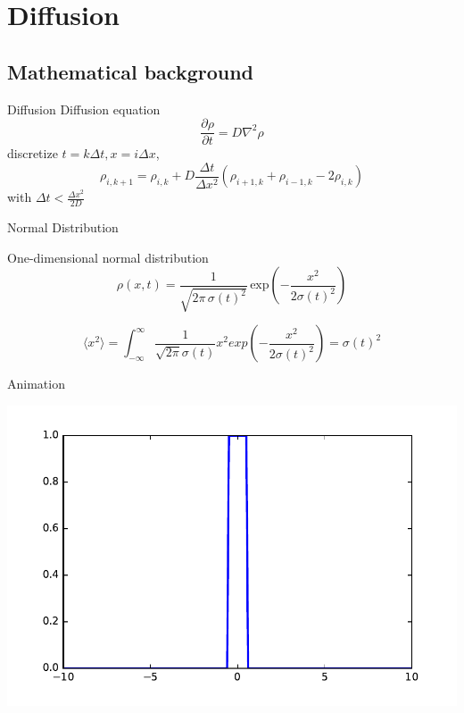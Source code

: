 \documentclass{beamer}
\begin{document}
\section{Diffusion}


\subsection{Mathematical background}

\begin{frame}{Diffusion}
	\quad Diffusion equation
	\begin{equation}
	\frac{\partial\rho}{\partial t}=D\nabla^2\rho
	\end{equation}
	\quad discretize $t=k\Delta t, x=i\Delta x$,
	\begin{equation}
	\rho_{i,k+1}=\rho_{i,k}+D\frac{\Delta t}{\Delta x^2}(\rho_{i+1,k}+\rho_{i-1,k}-2\rho_{i,k})
	\end{equation}
	\quad \quad with $\Delta t<\frac{\Delta x^2}{2D}$
\end{frame}

\begin{frame}{Normal Distribution}
	
	One-dimensional normal distribution
	\begin{equation}
	\rho(x,t) = \frac{1}{\sqrt{2 \pi \, \sigma(t)^2}} \, \text{exp} \left( - \frac{x^2}{2\sigma(t)^2} \right)
	\end{equation}
	
	\begin{equation}
	\langle x^2\rangle=\int_{-\infty}^{\infty}\frac{1}{\sqrt{2\pi}\sigma(t)}x^2exp(-\frac{x^2}{2\sigma(t)^2})=\sigma(t)^2
	\end{equation}
\end{frame}


\begin{frame}{Animation}
	\begin{center}
		\href{run:./diffusion.mp4}{
			\includegraphics[scale=0.65]{initial.pdf}}
	\end{center}
\end{frame}
\end{document}
